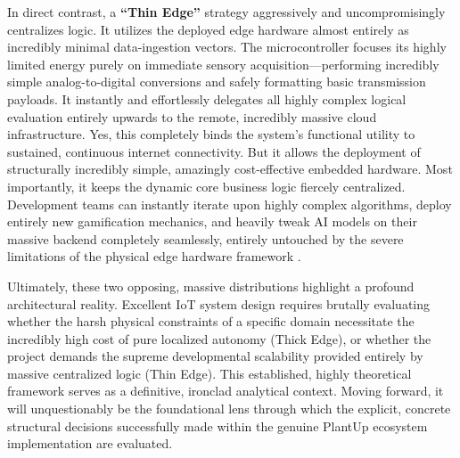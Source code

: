In direct contrast, a \textbf{``Thin Edge''} strategy aggressively and uncompromisingly centralizes logic. It utilizes the deployed edge hardware almost entirely as incredibly minimal data-ingestion vectors. The microcontroller focuses its highly limited energy purely on immediate sensory acquisition—performing incredibly simple analog-to-digital conversions and safely formatting basic transmission payloads. It instantly and effortlessly delegates all highly complex logical evaluation entirely upwards to the remote, incredibly massive cloud infrastructure. Yes, this completely binds the system's functional utility to sustained, continuous internet connectivity. But it allows the deployment of structurally incredibly simple, amazingly cost-effective embedded hardware. Most importantly, it keeps the dynamic core business logic fiercely centralized. Development teams can instantly iterate upon highly complex algorithms, deploy entirely new gamification mechanics, and heavily tweak AI models on their massive backend completely seamlessly, entirely untouched by the severe limitations of the physical edge hardware framework \cite{blog_elest_supabase_self_host, iotclass_edge_fog_cloud}.

Ultimately, these two opposing, massive distributions highlight a profound architectural reality. Excellent IoT system design requires brutally evaluating whether the harsh physical constraints of a specific domain necessitate the incredibly high cost of pure localized autonomy (Thick Edge), or whether the project demands the supreme developmental scalability provided entirely by massive centralized logic (Thin Edge). This established, highly theoretical framework serves as a definitive, ironclad analytical context. Moving forward, it will unquestionably be the foundational lens through which the explicit, concrete structural decisions successfully made within the genuine PlantUp ecosystem implementation are evaluated.
